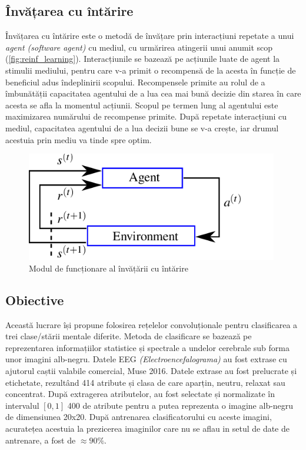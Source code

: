 \subsection*{Învățarea cu întărire}
Învățarea cu întărire este o metodă de învățare prin interacțiuni repetate a unui \textit{agent (software agent)} cu mediul, cu urmărirea atingerii unui anumit scop (\autoref*{fig:reinf_learning}). Interacțiunile se bazează pe acțiunile luate de agent la stimulii mediului, pentru care v-a primit o recompensă de la acesta în funcție de beneficiul adus îndeplinirii scopului. Recompensele primite au rolul de a îmbunătății capacitatea agentului de a lua cea mai bună decizie din starea în care acesta se afla la momentul acțiunii. Scopul pe termen lung al agentului este maximizarea numărului de recompense primite. După repetate interacțiuni cu mediul, capacitatea agentului de a lua decizii bune se v-a crește, iar drumul acestuia prin mediu va tinde spre optim.
\begin{figure}[h]
	\center
	\includegraphics[width=11cm, keepaspectratio]{fig/cap1/The-reinforcement-learning-paradigm-consists-of-an-agent-interacting-with-an.png}
	\caption{Modul de funcționare al învățării cu întărire \cite{fig:reinforcement}}
	\label{fig:reinf_learning}
\end{figure}

\subsection*{Obiective}
Această lucrare își propune folosirea rețelelor convoluționale pentru clasificarea a trei clase/stării mentale diferite. Metoda de clasificare se bazează pe reprezentarea informațiilor statistice și spectrale a undelor cerebrale sub forma unor imagini alb-negru. Datele EEG \textit{(Electroencefalograma)} au fost extrase cu ajutorul caștii valabile comercial, Muse 2016. Datele extrase au fost prelucrate și etichetate, rezultând 414 atribute și clasa de care aparțin, neutru, relaxat sau concentrat. După extragerea atributelor, au fost selectate și normalizate în intervalul $[0,1]$ 400 de atribute pentru a putea reprezenta o imagine alb-negru de dimensiunea 20x20. După antrenarea clasificatorului cu aceste imagini, acuratețea acestuia la prezicerea imaginilor care nu se aflau in setul de date de antrenare, a fost de $\approx90\%$.

